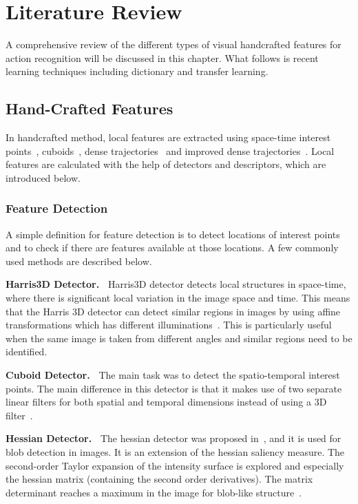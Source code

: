 \chapter{Literature Review}
\label{LR}

A comprehensive review of the different types of visual handcrafted features for action recognition will be discussed in this chapter. What follows is recent learning techniques including dictionary and transfer learning.

\section{Hand-Crafted Features}
In handcrafted method, local features are extracted using space-time interest points~\cite{Laptev2005}, cuboids~\cite{6126543}, dense trajectories~\cite{HengWang:2011:ARD:2191740.2192078} and improved dense trajectories~\cite{wang2013action}. Local features are calculated with the help of detectors and descriptors, which are introduced below.
\subsection{Feature Detection}
A simple definition for feature detection is to detect locations of interest points and to check if there are features available at those locations. A few commonly used methods are described below. %

\noindent
\textbf{Harris3D Detector.~}
Harris3D detector detects local structures in space-time, where there is significant local variation in the image space and time. This means that the Harris 3D detector can detect similar regions in images by using affine transformations which has different illuminations~\cite{Laptev2005}. This is particularly useful when the same image is taken from different angles and similar regions need to be identified.%

\noindent
\textbf{Cuboid Detector.~}
The main task was to detect the spatio-temporal interest points. The main difference in this detector is that it makes use of two separate linear filters for both spatial and temporal dimensions instead of using a 3D filter~\cite{Dollar:2005:BRV:1259587.1259830}.%

\noindent
\textbf{Hessian Detector.~}
The hessian detector was proposed in~\cite{Willems2008}, and it is used for blob detection in images. It is an extension of the hessian saliency measure. The second-order Taylor expansion of the intensity surface is explored and especially the hessian matrix (containing the second order derivatives). 
The matrix determinant reaches a maximum in the image for blob-like structure~\cite{tuytelaars2008local12}. %

